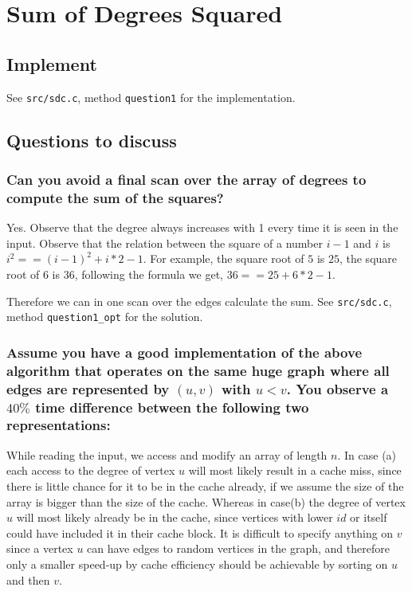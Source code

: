 \section{Sum of Degrees Squared} 
\subsection{Implement}
See \texttt{src/sdc.c}, method \texttt{question1} for the implementation.

\subsection{Questions to discuss}
\subsubsection{Can you avoid a final scan over the array of degrees to compute the sum of the squares?}
Yes. Observe that the degree always increases with 1 every time it is seen in the input. Observe that the relation between the square of a number $i-1$ and $i$ is $i^2 == (i-1)^2 + i*2-1$. For example, the square root of $5$ is $25$, the square root of $6$ is $36$, following the formula we get, $36 == 25+6*2-1$.

Therefore we can in one scan over the edges calculate the sum. See \texttt{src/sdc.c}, method \texttt{question1\_opt} for the solution.

\subsubsection{Assume you have a good implementation of the above algorithm that operates on the same huge graph where all edges are represented by $(u, v)$ with $u < v$. You observe a $40\%$ time difference between the following two representations:
}
While reading the input, we access and modify an array of length $n$. In case (a) each access to the degree of vertex $u$ will most likely result in a cache miss, since there is little chance for it to be in the cache already, if we assume the size of the array is bigger than the size of the cache. Whereas in case(b) the degree of vertex $u$ will most likely already be in the cache, since vertices with lower $id$ or itself could have included it in their cache block. It is difficult to specify anything on $v$ since a vertex $u$ can have edges to random vertices in the graph, and therefore only a smaller speed-up by cache efficiency should be achievable by sorting on $u$ and then $v$.


